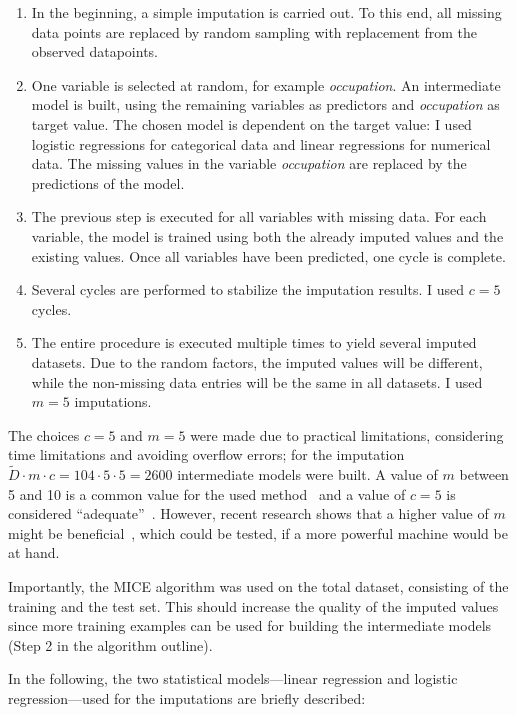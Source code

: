 \documentclass[a4paper,11pt]{article}
\begin{document}
\begin{enumerate}
\item In the beginning, a simple imputation is carried out. To
  this end, all missing data points are replaced by random sampling
  with replacement from the observed datapoints.
\item One variable is selected at random, for example
  \emph{occupation}. An intermediate model is built, using the
  remaining variables as predictors and \emph{occupation} as target
  value. The chosen model is dependent on the target value: I used
  logistic regressions for categorical data and linear regressions for
  numerical data. The missing values in the variable \emph{occupation}
  are replaced by the predictions of the model.
\item The previous step is executed for all variables with missing
  data. For each variable, the model is trained using both the already
  imputed values and the existing values. Once all variables have been
  predicted, one cycle is complete.
\item Several cycles are performed to stabilize the imputation
  results. I used $c = 5$ cycles.
\item The entire procedure is executed multiple times to yield
  several imputed datasets. Due to the random factors, the imputed
  values will be different, while the non-missing data entries will be
  the same in all datasets. I used $m = 5$ imputations.
\end{enumerate}
The choices $c = 5$ and $m = 5$ were made due to practical
limitations, considering time limitations and avoiding overflow
errors; for the imputation
$\tilde{D} \cdot m \cdot c = 104 \cdot 5 \cdot 5 = 2600$ intermediate
models were built. A value of $m$ between 5 and 10 is a common value
for the used method~\cite{royston2011multiple} and a value of $c = 5$
is considered ``adequate''~\cite{van1999multiple}. However, recent
research shows that a higher value of $m$ might be
beneficial~\cite{white2011multiple}, which could be tested, if a more
powerful machine would be at hand.

Importantly, the MICE algorithm was used on the total dataset,
consisting of the training and the test set. This should increase the
quality of the imputed values since more training examples can be used
for building the intermediate models (Step 2 in the algorithm
outline).

In the following, the two statistical models---linear regression and
logistic regression---used for the imputations are briefly described:
\end{document}
